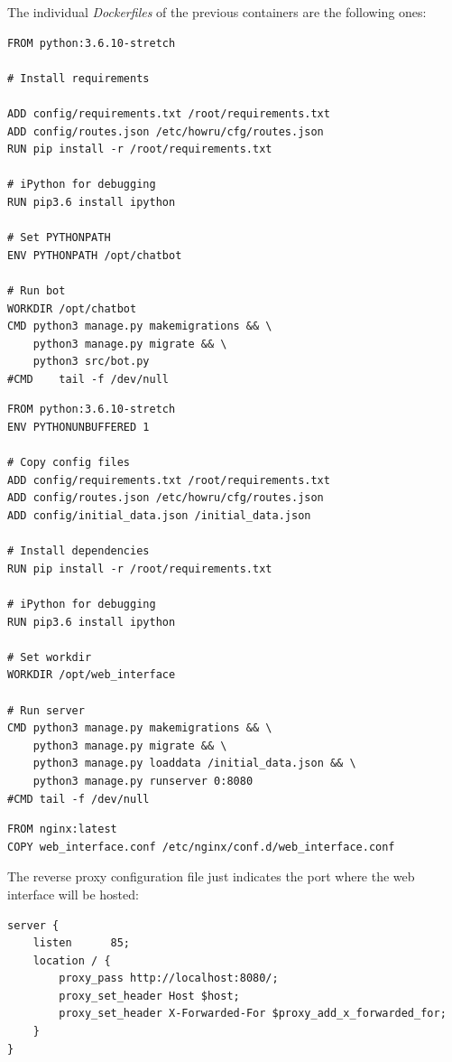 \documentclass[12pt,english]{article}
\begin{document}
The individual \emph{Dockerfiles} of the previous containers are the following ones:

\begin{lstlisting}[language=docker, caption={HOW-R-U conversational agent Dockerfile}, captionpos=b]
FROM python:3.6.10-stretch

# Install requirements

ADD config/requirements.txt /root/requirements.txt
ADD config/routes.json /etc/howru/cfg/routes.json
RUN pip install -r /root/requirements.txt

# iPython for debugging
RUN pip3.6 install ipython

# Set PYTHONPATH
ENV PYTHONPATH /opt/chatbot

# Run bot
WORKDIR /opt/chatbot
CMD python3 manage.py makemigrations && \
    python3 manage.py migrate && \
    python3 src/bot.py
#CMD    tail -f /dev/null
\end{lstlisting}

\begin{lstlisting}[language=nginx, caption={HOW-R-U web interface Dockerfile}, captionpos=b]
FROM python:3.6.10-stretch
ENV PYTHONUNBUFFERED 1

# Copy config files
ADD config/requirements.txt /root/requirements.txt
ADD config/routes.json /etc/howru/cfg/routes.json
ADD config/initial_data.json /initial_data.json

# Install dependencies
RUN pip install -r /root/requirements.txt

# iPython for debugging
RUN pip3.6 install ipython

# Set workdir
WORKDIR /opt/web_interface

# Run server
CMD python3 manage.py makemigrations && \
    python3 manage.py migrate && \
    python3 manage.py loaddata /initial_data.json && \
    python3 manage.py runserver 0:8080
#CMD tail -f /dev/null
\end{lstlisting}

\begin{lstlisting}[language=docker, caption={HOW-R-U web reverse proxy Dockerfile}, captionpos=b]
FROM nginx:latest
COPY web_interface.conf /etc/nginx/conf.d/web_interface.conf
\end{lstlisting}

The reverse proxy configuration file just indicates the port where the web interface will be hosted:
\begin{lstlisting}[language=nginx, mathescape=false, caption={HOW-R-U web reverse proxy configuration file}, captionpos=b]
server {
    listen      85;
    location / {
        proxy_pass http://localhost:8080/;
        proxy_set_header Host $host;
        proxy_set_header X-Forwarded-For $proxy_add_x_forwarded_for;
    }
}
\end{lstlisting}
\end{document}
